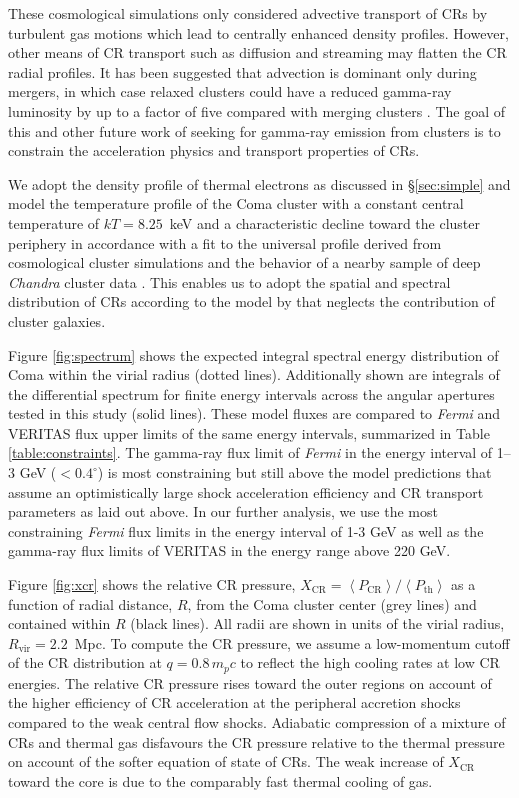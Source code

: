 \documentclass[12pt,manuscript]{aastex}
\newcommand{\expval}[1]{\left\langle #1 \right\rangle}
\newcommand{\rmn}{\mathrm}
\newcommand{\CR}{\mathrm{CR}}
\begin{document}
These cosmological simulations only considered advective transport of CRs by turbulent gas motions
which lead to centrally enhanced density profiles.  However, other means of CR transport such as diffusion
and streaming may flatten the CR radial profiles. It has been suggested that advection is dominant
only during mergers, in which case relaxed clusters could have a reduced gamma-ray luminosity by up
to a factor of five compared with merging clusters
\citep{article:EnsslinPfrommerMiniatiSubramanian:2011}. The goal of this and other future work of
seeking for gamma-ray emission from clusters is to constrain the acceleration physics and transport
properties of CRs.

We adopt the density profile of thermal electrons as discussed in \S \ref{sec:simple} and model the
temperature profile
of the Coma cluster with a constant central temperature of $kT= 8.25$~keV and a characteristic
decline toward the cluster periphery in accordance with a fit to the universal profile derived from
cosmological cluster simulations \citep{article:PinzkePfrommer:2010, article:Pfrommer_etal:2007}
and the behavior of a nearby sample of deep {\em Chandra} cluster data
\citep{article:Vikhlinin_etal:2005}. This enables us to adopt the spatial and spectral distribution
of CRs according to the model by \citet{article:PinzkePfrommer:2010} that neglects the contribution
of cluster galaxies.

Figure \ref{fig:spectrum} shows the expected integral spectral energy distribution of Coma within
the virial radius (dotted lines). Additionally shown are integrals of the differential spectrum for
finite energy intervals across the angular apertures tested in this study (solid lines). These
model fluxes are compared to {\em Fermi} and VERITAS flux upper limits of the same energy intervals,
summarized in Table \ref{table:constraints}.  The gamma-ray flux limit of {\em Fermi} in the energy
interval of 1--3 GeV ($<0.4^\circ$) is most constraining but still above the model predictions that
assume an optimistically large shock acceleration efficiency and CR transport parameters as laid
out above.  In our further analysis, we use the most constraining {\em Fermi} flux limits in the
energy interval of 1-3 GeV as well as the gamma-ray flux limits of VERITAS in the energy range above
220 GeV.

Figure \ref{fig:xcr} shows the relative CR pressure, $X_{\CR} =
\expval{P_{\CR}}/\expval{P_\rmn{th}}$ as a function of radial distance, $R$, from the Coma cluster
center (grey lines) and contained within $R$ (black lines). All radii are shown in units of the virial
radius, $R_\rmn{vir}=2.2$~Mpc. To compute the CR pressure, we assume a low-momentum cutoff of the CR
distribution at $q = 0.8\,m_p c$ to reflect the high cooling rates at low CR energies. The relative CR
pressure rises toward the outer regions on account of the higher efficiency of CR acceleration at the
peripheral accretion shocks compared to the weak central flow shocks. Adiabatic compression of a
mixture of CRs and thermal gas disfavours the
CR pressure relative to the thermal pressure on account of the softer equation of state of CRs. The
weak increase of $X_{\CR}$ toward the core is due to the comparably fast thermal cooling of gas.
\end{document}
